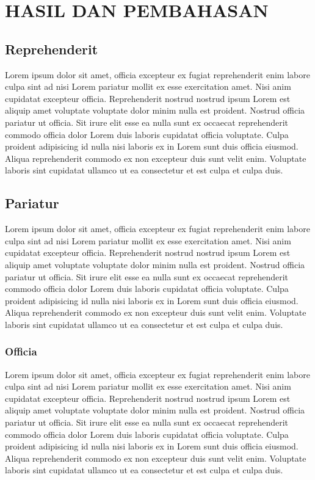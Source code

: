 \chapter{HASIL DAN PEMBAHASAN}
\section{Reprehenderit}
Lorem ipsum dolor sit amet, officia excepteur ex fugiat reprehenderit enim labore culpa sint ad nisi Lorem pariatur mollit ex esse exercitation amet. Nisi anim cupidatat excepteur officia. Reprehenderit nostrud nostrud ipsum Lorem est aliquip amet voluptate voluptate dolor minim nulla est proident. Nostrud officia pariatur ut officia. Sit irure elit esse ea nulla sunt ex occaecat reprehenderit commodo officia dolor Lorem duis laboris cupidatat officia voluptate. Culpa proident adipisicing id nulla nisi laboris ex in Lorem sunt duis officia eiusmod. Aliqua reprehenderit commodo ex non excepteur duis sunt velit enim. Voluptate laboris sint cupidatat ullamco ut ea consectetur et est culpa et culpa duis.

\section{Pariatur}
Lorem ipsum dolor sit amet, officia excepteur ex fugiat reprehenderit enim labore culpa sint ad nisi Lorem pariatur mollit ex esse exercitation amet. Nisi anim cupidatat excepteur officia. Reprehenderit nostrud nostrud ipsum Lorem est aliquip amet voluptate voluptate dolor minim nulla est proident. Nostrud officia pariatur ut officia. Sit irure elit esse ea nulla sunt ex occaecat reprehenderit commodo officia dolor Lorem duis laboris cupidatat officia voluptate. Culpa proident adipisicing id nulla nisi laboris ex in Lorem sunt duis officia eiusmod. Aliqua reprehenderit commodo ex non excepteur duis sunt velit enim. Voluptate laboris sint cupidatat ullamco ut ea consectetur et est culpa et culpa duis.

\subsection{Officia}
Lorem ipsum dolor sit amet, officia excepteur ex fugiat reprehenderit enim labore culpa sint ad nisi Lorem pariatur mollit ex esse exercitation amet. Nisi anim cupidatat excepteur officia. Reprehenderit nostrud nostrud ipsum Lorem est aliquip amet voluptate voluptate dolor minim nulla est proident. Nostrud officia pariatur ut officia. Sit irure elit esse ea nulla sunt ex occaecat reprehenderit commodo officia dolor Lorem duis laboris cupidatat officia voluptate. Culpa proident adipisicing id nulla nisi laboris ex in Lorem sunt duis officia eiusmod. Aliqua reprehenderit commodo ex non excepteur duis sunt velit enim. Voluptate laboris sint cupidatat ullamco ut ea consectetur et est culpa et culpa duis.

